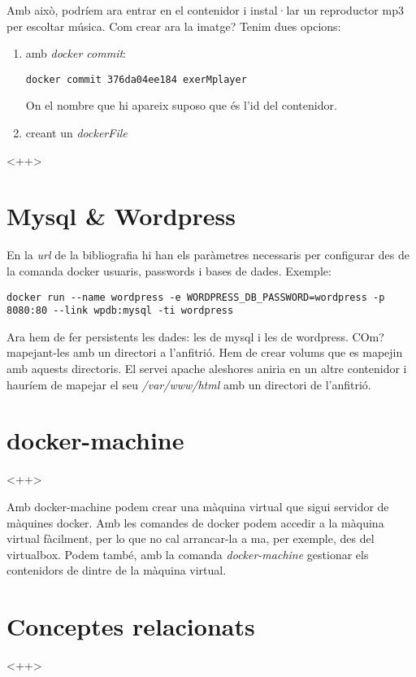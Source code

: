 \documentclass[a4paper]{article}
\begin{document}
Amb això, podríem ara entrar en el contenidor i instal·lar un reproductor mp3 per escoltar música. Com crear ara la imatge? Tenim dues opcions:

\begin{enumerate}
	\item amb \textit{docker commit}:
		\begin{lstlisting}
docker commit 376da04ee184 exerMplayer
		\end{lstlisting}
		On el nombre que hi apareix suposo que \'{e}s l'id del contenidor.

	\item creant un \textit{dockerFile}
\end{enumerate}<++>

\section{Mysql & Wordpress}

En la \textit{url} de la bibliografia \cite{MYSQL} hi han els paràmetres necessaris per configurar des de la comanda docker usuaris, passwords i bases de dades. Exemple:

\begin{lstlisting}
docker run --name wordpress -e WORDPRESS_DB_PASSWORD=wordpress -p 8080:80 --link wpdb:mysql -ti wordpress
\end{lstlisting}

Ara hem de fer persistents les dades: les de mysql i les de wordpress. COm? mapejant-les amb un directori a l'anfitrió. Hem de crear volums que es mapejin amb aquests directoris. El servei apache aleshores aniria en un altre contenidor i hauríem de mapejar el seu \textit{/var/www/html} amb un directori de l'anfitrió.

\section{docker-machine}<++>

Amb docker-machine podem crear una màquina virtual que sigui servidor de màquines docker. Amb les comandes de docker podem accedir a la màquina virtual fàcilment, per lo que no cal arrancar-la a ma, per exemple, des del virtualbox. Podem tamb\'{e}, amb la comanda \textit{docker-machine} gestionar els contenidors de dintre de la màquina virtual.



\section{Conceptes relacionats}<++>
\end{document}
